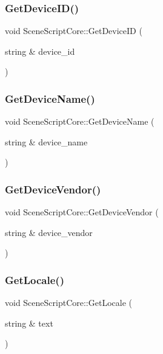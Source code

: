 \subsubsection{\texorpdfstring{Get\+Device\+I\+D()}{GetDeviceID()}}
{\footnotesize\ttfamily void Scene\+Script\+Core\+::\+Get\+Device\+ID (\begin{DoxyParamCaption}\item[{string \&}]{device\+\_\+id }\end{DoxyParamCaption})}

\hypertarget{class_scene_script_core_a5c342cd6b6d454099d79d07d1d6c6c34}{}\label{class_scene_script_core_a5c342cd6b6d454099d79d07d1d6c6c34} 
\subsubsection{\texorpdfstring{Get\+Device\+Name()}{GetDeviceName()}}
{\footnotesize\ttfamily void Scene\+Script\+Core\+::\+Get\+Device\+Name (\begin{DoxyParamCaption}\item[{string \&}]{device\+\_\+name }\end{DoxyParamCaption})}

\hypertarget{class_scene_script_core_a1227ece02df6dcd21b837483a13b7414}{}\label{class_scene_script_core_a1227ece02df6dcd21b837483a13b7414} 
\subsubsection{\texorpdfstring{Get\+Device\+Vendor()}{GetDeviceVendor()}}
{\footnotesize\ttfamily void Scene\+Script\+Core\+::\+Get\+Device\+Vendor (\begin{DoxyParamCaption}\item[{string \&}]{device\+\_\+vendor }\end{DoxyParamCaption})}

\hypertarget{class_scene_script_core_a01cd765be66cde92415f31171d182d9e}{}\label{class_scene_script_core_a01cd765be66cde92415f31171d182d9e} 
\subsubsection{\texorpdfstring{Get\+Locale()}{GetLocale()}}
{\footnotesize\ttfamily void Scene\+Script\+Core\+::\+Get\+Locale (\begin{DoxyParamCaption}\item[{string \&}]{text }\end{DoxyParamCaption})}

